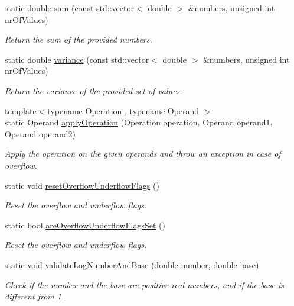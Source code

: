 \begin{DoxyCompactItemize}
static double \hyperlink{classmultiscale_1_1Numeric_ad54bc039dde4ff22b8c4b5d3708d65bb}{sum} (const std\-::vector$<$ double $>$ \&numbers, unsigned int nr\-Of\-Values)
\begin{DoxyCompactList}\small\item\em Return the sum of the provided numbers. \end{DoxyCompactList}\item 
static double \hyperlink{classmultiscale_1_1Numeric_aabe74259c165a5f07a209c82699729e2}{variance} (const std\-::vector$<$ double $>$ \&numbers, unsigned int nr\-Of\-Values)
\begin{DoxyCompactList}\small\item\em Return the variance of the provided set of values. \end{DoxyCompactList}\item 
{\footnotesize template$<$typename Operation , typename Operand $>$ }\\static Operand \hyperlink{classmultiscale_1_1Numeric_a6fe5731e0a4b2728bd4827b564102eb3}{apply\-Operation} (Operation operation, Operand operand1, Operand operand2)
\begin{DoxyCompactList}\small\item\em Apply the operation on the given operands and throw an exception in case of overflow. \end{DoxyCompactList}\item 
static void \hyperlink{classmultiscale_1_1Numeric_a5b2a0b5b4aaf837d3d6cc8c3d41d445b}{reset\-Overflow\-Underflow\-Flags} ()
\begin{DoxyCompactList}\small\item\em Reset the overflow and underflow flags. \end{DoxyCompactList}\item 
static bool \hyperlink{classmultiscale_1_1Numeric_a096d5367722cb8571ece2bfdb800cea5}{are\-Overflow\-Underflow\-Flags\-Set} ()
\begin{DoxyCompactList}\small\item\em Reset the overflow and underflow flags. \end{DoxyCompactList}\item 
static void \hyperlink{classmultiscale_1_1Numeric_a552ccfdcef70918e416191eecaa94481}{validate\-Log\-Number\-And\-Base} (double number, double base)
\begin{DoxyCompactList}\small\item\em Check if the number and the base are positive real numbers, and if the base is different from 1. \end{DoxyCompactList}\item 

\end{DoxyCompactItemize}
